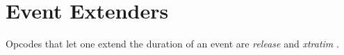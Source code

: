 \begin{comment}
\documentclass[10pt]{article}
\usepackage{fullpage, graphicx, url}
\setlength{\parskip}{1ex}
\setlength{\parindent}{0ex}
\title{Event Extenders}



\begin{tabular}{ccc}
The Alternative Csound Reference Manual & & \\
Previous &MIDI Support &Next

\end{tabular}

\end{comment}
\section{Event Extenders}


  Opcodes that let one extend the duration of an event are \emph{release}
 and \emph{xtratim}
. 


\begin{comment}
\begin{tabular}{lcr}
Previous &Home &Next \\
Converters &Up &Generic Input and Output

\end{tabular}



\end{comment}
